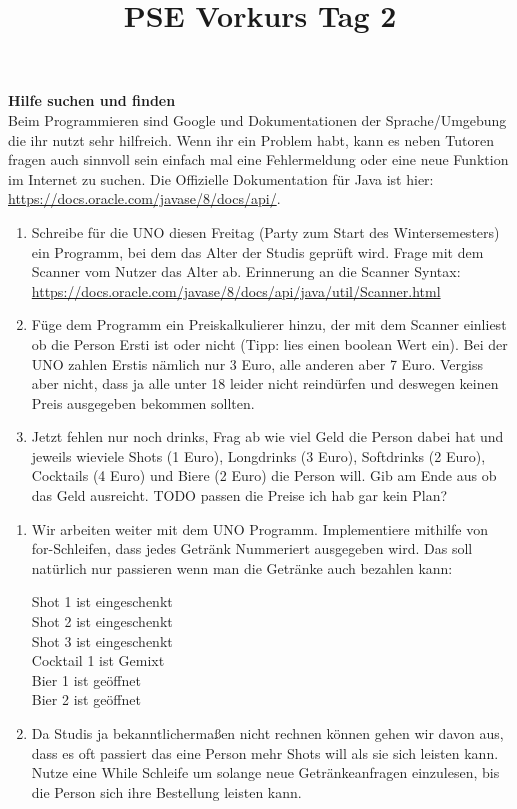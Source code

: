 \documentclass{../../sheet}
\title{PSE Vorkurs Tag 2}
\begin{document}
\maketitle

\textbf{Hilfe suchen und finden}\\
Beim Programmieren sind Google und Dokumentationen der Sprache/Umgebung die ihr nutzt sehr hilfreich. Wenn ihr ein Problem habt, kann es neben Tutoren fragen auch sinnvoll sein einfach mal eine Fehlermeldung oder eine neue Funktion im Internet zu suchen. Die Offizielle Dokumentation für Java ist hier: \url{https://docs.oracle.com/javase/8/docs/api/}.

\newpage
{}
\begin{enumerate}
    \item Schreibe für die UNO diesen Freitag (Party zum Start des Wintersemesters) ein Programm, bei dem das Alter der Studis geprüft wird. Frage mit dem Scanner vom Nutzer das Alter ab. Erinnerung an die Scanner Syntax:\\ \url{https://docs.oracle.com/javase/8/docs/api/java/util/Scanner.html}
    \item Füge dem Programm ein Preiskalkulierer hinzu, der mit dem Scanner einliest ob die Person Ersti ist oder nicht (Tipp: lies einen boolean Wert ein). Bei der UNO zahlen Erstis nämlich nur 3 Euro, alle anderen aber 7 Euro. Vergiss aber nicht, dass ja alle unter 18 leider nicht reindürfen und deswegen keinen Preis ausgegeben bekommen sollten.
    \item Jetzt fehlen nur noch drinks, Frag ab wie viel Geld die Person dabei hat und jeweils wieviele Shots (1 Euro), Longdrinks (3 Euro), Softdrinks (2 Euro), Cocktails (4 Euro) und Biere (2 Euro) die Person will. Gib am Ende aus ob das Geld ausreicht.
          TODO passen die Preise ich hab gar kein Plan?
\end{enumerate}

\newpage
{}
\begin{enumerate}
    \item Wir arbeiten weiter mit dem UNO Programm. Implementiere mithilfe von for-Schleifen, dass jedes Getränk Nummeriert ausgegeben wird. Das soll natürlich nur passieren wenn man die Getränke auch bezahlen kann:
          \begin{ausgabe}
              Shot 1 ist  eingeschenkt\\
              Shot 2 ist  eingeschenkt\\
              Shot 3 ist  eingeschenkt\\
              Cocktail 1 ist  Gemixt\\
              Bier 1 ist geöffnet\\
              Bier 2 ist geöffnet
          \end{ausgabe}
    \item Da Studis ja bekanntlichermaßen nicht rechnen können gehen wir davon aus, dass es oft passiert das eine Person mehr Shots will als sie sich leisten kann. Nutze eine While Schleife um solange neue Getränkeanfragen einzulesen, bis die Person sich ihre Bestellung leisten kann.
\end{enumerate}
\end{document}
